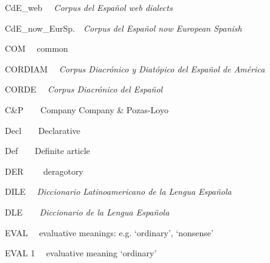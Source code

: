 \begin{styleStandard}
CdE\_web\textit{ \ \ Corpus del Español web dialects}
\end{styleStandard}

\begin{styleStandard}
CdE\_now\_EurSp.\ \ \textit{Corpus del Español now European Spanish}
\end{styleStandard}

\begin{styleStandard}
COM \ \ common
\end{styleStandard}

\begin{styleStandard}
CORDIAM \ \ \textit{Corpus Diacrónico y Diatópico del Español de América}
\end{styleStandard}

\begin{styleStandard}
CORDE \ \ \textit{Corpus Diacrónico del Español}
\end{styleStandard}

\begin{styleStandard}
C\&P\ \ \ \ Company Company \& Pozas-Loyo
\end{styleStandard}

\begin{styleStandard}
Decl\ \ \ \ Declarative
\end{styleStandard}

\begin{styleStandard}
Def\ \ \ \ Definite article
\end{styleStandard}

\begin{styleStandard}
DER \ \ \ \ deragotory
\end{styleStandard}

\begin{styleStandard}
DILE \ \ \textit{Diccionario Latinoamericano de la Lengua Española}
\end{styleStandard}

\begin{styleStandard}
DLE\ \ \ \ \textit{Diccionario de la Lengua Española}
\end{styleStandard}

\begin{styleStandard}
EVAL \ \ evaluative meanings: e.g. ‘ordinary’, ‘nonsense’
\end{styleStandard}

\begin{styleStandard}
EVAL 1 \ \ evaluative meaning ‘ordinary’
\end{styleStandard}

